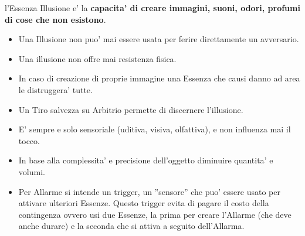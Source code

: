 \documentclass[a4paper,11pt,twoside,openany]{book}
\begin{document}
\label{essenza-illusione---magnetismo}

l'Essenza Illusione e' la \textbf{capacita' di creare immagini, suoni,
odori, profumi di cose che non esistono}.
\begin{itemize}
\item 
Una Illusione non puo' mai essere usata per ferire direttamente un avversario. 
\item 
Una illusione non offre mai resistenza fisica. 
\item 
In caso di creazione di proprie immagine una Essenza che causi danno ad area le distruggera' tutte. 
\item 
Un Tiro salvezza su Arbitrio permette di discernere l'illusione. 
\item 
E' sempre e solo sensoriale (uditiva, visiva, olfattiva), e non influenza mai il tocco. 
\item 
In base alla complessita' e precisione dell'oggetto diminuire quantita' e volumi. 
\item 
Per Allarme si intende un trigger, un ''sensore'' che puo' essere usato per attivare ulteriori Essenze. Questo trigger evita di pagare il costo della contingenza ovvero usi due Essenze, la prima per creare l'Allarme (che deve anche durare) e la seconda che si attiva a seguito
dell'Allarma. 
\end{itemize}

\bigskip
\end{document}
